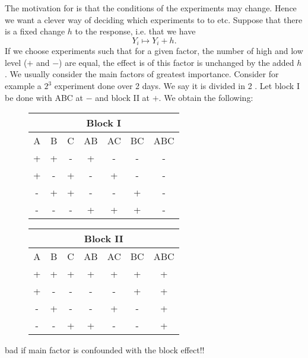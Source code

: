 The motivation for  is that the conditions of the experiments may change. Hence we want a clever way of deciding which experiments to to  etc. Suppose that there is a fixed change $h$ to the response, i.e. that  we have
$$
    Y_i \mapsto Y_i + h.
$$
If we choose experiments such that for a given factor, the number of high and low level ($+$ and $-$) are equal, the effect is of this factor is unchanged by the added $h$. We usually consider the main factors of greatest importance. Consider for example a $2^3$ experiment done over 2 days. We say it is divided in 2 . Let block I be done with ABC at $-$ and block II at $+$. We obtain the following:

\begin{figure}[H]\centering
    \begin{tabular}{*7c}
        \multicolumn{7}{c}{\textbf{Block I}}\\
        \toprule
        A & B & C & AB & AC & BC & ABC\\
        \midrule
        + & + & - & + & - & - & - \\
        + & - & + & - & + & - & - \\
        - & + & + & - & - & + & - \\
        - & - & - & + & + & + & - \\
        \bottomrule
    \end{tabular}        
        \quad
    \begin{tabular}{*7c}
        \multicolumn{7}{c}{\textbf{Block II}}\\        \toprule
        A & B & C & AB & AC & BC & ABC \\
        \midrule
        + & + & + & + & + & + & + \\
        + & - & - & - & - & + & + \\
        - & + & - & - & + & - & + \\
        - & - & + & + & - & - & + \\
        \bottomrule
    \end{tabular}        
\end{figure}

bad if main factor is confounded with the block effect!!